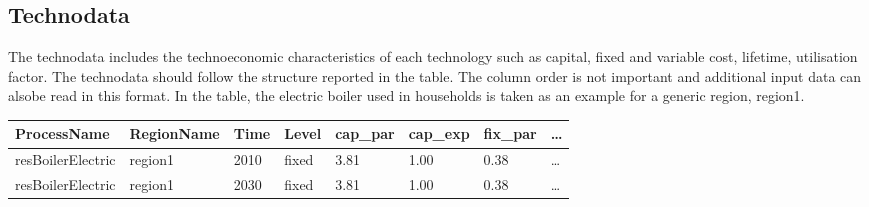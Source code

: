 \documentclass[letterpaper,10pt,english]{sphinxmanual}
\begin{document}
\subsection{Techno\sphinxhyphen{}data}
\label{\detokenize{inputs/technodata:techno-data}}\label{\detokenize{inputs/technodata:inputs-technodata}}\label{\detokenize{inputs/technodata::doc}}
The techno\sphinxhyphen{}data includes the techno\sphinxhyphen{}economic characteristics of each technology such
as capital, fixed and variable cost, lifetime, utilisation factor.
The techno\sphinxhyphen{}data should follow the structure reported in the table. The column order
is not important and additional input data can alsobe read in this format. In the table,
the electric boiler used in households is taken as an example for a generic region, region1.


\begin{savenotes}\sphinxattablestart
\centering
{}
\sphinxthecaptionisattop
{}\label{\detokenize{inputs/technodata:id1}}
\sphinxaftertopcaption
\begin{tabulary}{\linewidth}[t]{|T|T|T|T|T|T|T|T|}
\hline
\sphinxstyletheadfamily 
ProcessName
&\sphinxstyletheadfamily 
RegionName
&\sphinxstyletheadfamily 
Time
&\sphinxstyletheadfamily 
Level
&\sphinxstyletheadfamily 
cap\_par
&\sphinxstyletheadfamily 
cap\_exp
&\sphinxstyletheadfamily 
fix\_par
&\sphinxstyletheadfamily 
…
\\
\hline
resBoilerElectric
&
region1
&
2010
&
fixed
&
3.81
&
1.00
&
0.38
&
…
\\
\hline
resBoilerElectric
&
region1
&
2030
&
fixed
&
3.81
&
1.00
&
0.38
&
…
\\
\hline
\end{tabulary}
\par
\sphinxattableend\end{savenotes}
\end{document}
